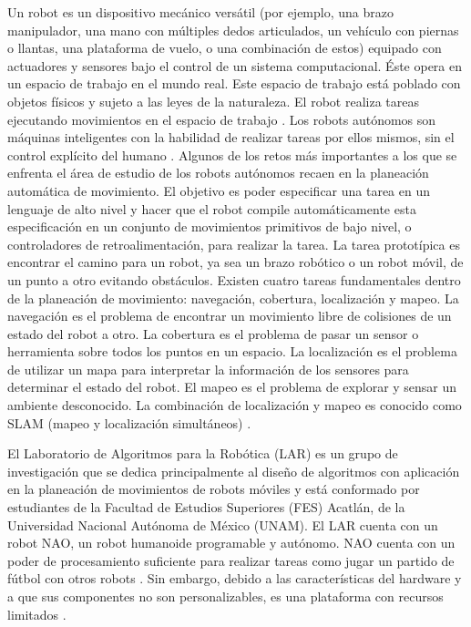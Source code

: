Un robot es un dispositivo mecánico versátil (por ejemplo,
una brazo manipulador, una mano con múltiples dedos 
articulados, un vehículo con piernas o llantas, una
plataforma de vuelo, o una combinación de estos)
equipado con actuadores y sensores bajo el control
de un sistema computacional. 
Éste opera en un espacio de trabajo en el mundo real.
Este espacio de trabajo está poblado con objetos físicos
y sujeto a las leyes de la naturaleza.
El robot realiza tareas ejecutando movimientos en el 
espacio de trabajo \cite{latombe_1993}.
Los robots autónomos son máquinas inteligentes
con la habilidad de realizar tareas por ellos
mismos, sin el control explícito del humano \cite{bekey_2017}.
Algunos de los retos más importantes 
a los que se enfrenta el área de estudio de los
robots autónomos recaen en la planeación automática de movimiento. 
El objetivo es poder especificar una tarea en un lenguaje de alto nivel y hacer que el robot compile automáticamente esta especificación
en un conjunto de movimientos primitivos de bajo nivel, o controladores de retroalimentación, para realizar la tarea. 
La tarea prototípica es encontrar el camino 
para un robot, ya sea un brazo robótico o un robot móvil,
de un punto a otro evitando obstáculos.
Existen cuatro tareas fundamentales dentro 
de la planeación de movimiento: navegación, cobertura, localización y mapeo.
La navegación es el problema de encontrar un movimiento
libre de colisiones de un estado del robot a otro.
La cobertura es el problema de pasar un sensor o
herramienta sobre todos los puntos en un espacio.
La localización es el problema de utilizar un mapa
para interpretar la información de los sensores para
determinar el estado del robot. El mapeo es el problema de 
explorar y sensar un ambiente desconocido. La combinación
de localización y mapeo es conocido como SLAM (mapeo y localización simultáneos)  \cite{choset_2005}.

El Laboratorio de Algoritmos para la Robótica (LAR) es un grupo de 
investigación que se dedica principalmente al diseño de 
algoritmos con aplicación en la planeación de movimientos 
de robots móviles y está 
conformado por estudiantes de la Facultad de Estudios 
Superiores (FES) Acatlán, de la Universidad Nacional 
Autónoma de México (UNAM). El LAR cuenta con un robot NAO, un robot
humanoide programable y autónomo.
NAO cuenta con un poder de procesamiento suficiente para realizar 
tareas como jugar un partido de fútbol con otros robots \cite{splinfo2018}. Sin embargo, debido a las características
del hardware y a que sus componentes no son personalizables,
es una plataforma con recursos limitados \cite{aldebaranrobotics}.


